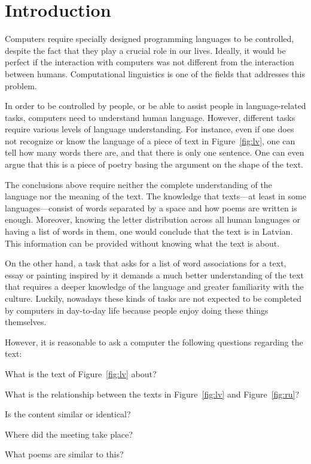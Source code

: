 \chapter{Introduction}
\label{ch:introduction}


Computers require specially designed programming languages to be controlled, despite the fact that they play a crucial role in our lives. Ideally, it would be perfect if the interaction with computers was not different from the interaction between humans. Computational linguistics is one of the fields that addresses this problem.

In order to be controlled by people, or be able to assist people in
language-related tasks, computers need to understand human language. However,
different tasks require various levels of language understanding. For instance,
even if one does not recognize or know the language of a piece of text in
Figure~\ref{fig:lv}, one can tell how many words there are, and that there is
only one sentence. One can even argue that this is a piece of poetry basing the
argument on the shape of the text.
%
%
%
%

The conclusions above require neither the complete understanding of the language nor the meaning of the text. The knowledge that texts---at least in some languages---consist of words separated by a space and how poems are written is enough. Moreover, knowing the letter distribution across all human languages or having a list of words in them, one would conclude that the text is in Latvian. This information can be provided without knowing what the text is about.



On the other hand, a task that asks for a list of  word associations for a text, essay or  painting inspired by it demands a much better understanding of the text that requires a deeper knowledge of the language and greater familiarity with the culture. Luckily, nowadays these kinds of tasks are not expected to be completed by computers in day-to-day life because people enjoy doing these things themselves.

However, it is reasonable to ask a computer the following questions regarding the text:
\begin{inparaenum}[a)]
\item What is the text of Figure~\ref{fig:lv} about?
\item What is the relationship between the texts in Figure~\ref{fig:lv} and
  Figure~\ref{fig:ru}?
\item Is the content similar or identical?
\item Where did the meeting take place?
\item What poems are similar to this?
\end{inparaenum}

